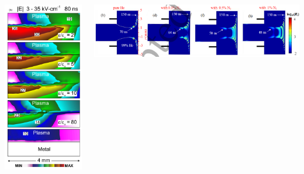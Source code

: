 \documentclass[sans, aspectratio=169]{beamer}
\begin{document}
\begin{frame}
	\begin{columns}
		\begin{column}{0.5\linewidth}
		\centering
		\includegraphics[width=0.8\linewidth]{proposition_from_students/uglyimage2d_pedro.png} 
		\end{column}
		\vline
		\begin{column}{0.5\linewidth}
		\centering
		\includegraphics[width=0.8\linewidth]{proposition_from_students/niceimage2d_pedro.png} 
		\end{column}
	\end{columns}
\end{frame}
\end{document}

